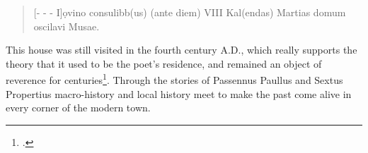 \documentclass[amsthm,ebook]{saparticle}
\begin{document}
\begin{quotation}

[{}- - - I]ọvino consulibb(us) (ante diem) VIII Kal(endas) Martias domum oscilavi Musae. 
\end{quotation}

This house was still visited in the fourth century A.D., which really supports the theory that it used to be the poet’s
residence, and remained an object of reverence for centuries\footnote{\citet[244-246]{Boldrighini2014}.}. Through the stories
of Passennus Paullus and Sextus Propertius macro-history and local history meet to make the past come alive in every
corner of the modern town.



\end{document}

